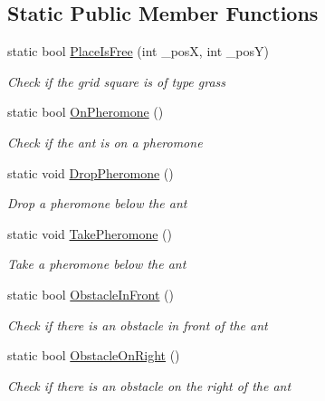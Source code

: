 \subsection*{Static Public Member Functions}
\begin{DoxyCompactItemize}
\item 
static bool \mbox{\hyperlink{class_krop_1_1_krohonde_1_1_game_a1478a79991c3ede806daa5a2e6bb1f69}{Place\+Is\+Free}} (int \+\_\+posX, int \+\_\+posY)
\begin{DoxyCompactList}\small\item\em Check if the grid square is of type grass \end{DoxyCompactList}\item 
static bool \mbox{\hyperlink{class_krop_1_1_krohonde_1_1_game_a4cc704bda7106616a4d467743bf703d6}{On\+Pheromone}} ()
\begin{DoxyCompactList}\small\item\em Check if the ant is on a pheromone \end{DoxyCompactList}\item 
static void \mbox{\hyperlink{class_krop_1_1_krohonde_1_1_game_a4d1fe0a45ef3e7ef8600a3ccef1289b0}{Drop\+Pheromone}} ()
\begin{DoxyCompactList}\small\item\em Drop a pheromone below the ant \end{DoxyCompactList}\item 
static void \mbox{\hyperlink{class_krop_1_1_krohonde_1_1_game_a17afa697841f604772d61aaf2b8719f8}{Take\+Pheromone}} ()
\begin{DoxyCompactList}\small\item\em Take a pheromone below the ant \end{DoxyCompactList}\item 
static bool \mbox{\hyperlink{class_krop_1_1_krohonde_1_1_game_a4eef675c83400a1028687124abc72406}{Obstacle\+In\+Front}} ()
\begin{DoxyCompactList}\small\item\em Check if there is an obstacle in front of the ant \end{DoxyCompactList}\item 
static bool \mbox{\hyperlink{class_krop_1_1_krohonde_1_1_game_a7a4f81955b1da1871586ee8f311cc20e}{Obstacle\+On\+Right}} ()
\begin{DoxyCompactList}\small\item\em Check if there is an obstacle on the right of the ant \end{DoxyCompactList}\item 

\end{DoxyCompactItemize}
